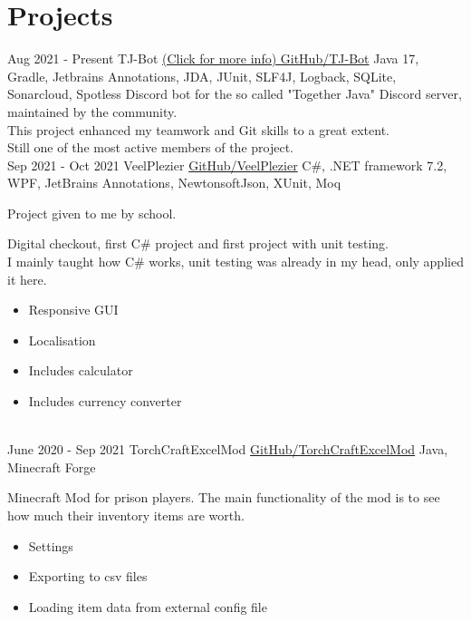 \documentclass[letterpaper]{twentysecondcv} %
\begin{document}
    \section{Projects}
    \begin{twenty} %
        \twentyitem
        {Aug 2021 -}
        {Present}
        {TJ-Bot}
        {\href{https://github.com/Together-Java/TJ-Bot/}{(Click for more info) GitHub/TJ-Bot}}
        {Java 17, Gradle, Jetbrains Annotations, JDA, JUnit, SLF4J, Logback, SQLite, Sonarcloud, Spotless}
        {
            Discord bot for the so called "Together Java" Discord server, maintained by the community.\\
        This project enhanced my teamwork and Git skills to a great extent.\\
        Still one of the most active members of the project.
        }\\

        \twentyitem
        {Sep 2021 -}
        {Oct 2021}
        {VeelPlezier}
        {\href{https://github.com/Tais993/VeelPlezier}{GitHub/VeelPlezier}}
        {C\#, .NET framework 7.2, WPF, JetBrains Annotations, NewtonsoftJson, XUnit, Moq}
        {
            Project given to me by school.

            Digital checkout, first C\# project and first project with unit testing.\\
        I mainly taught how C\# works, unit testing was already in my head, only applied it here.

            \begin{itemize}
                \item Responsive GUI
                \item Localisation
                \item Includes calculator
                \item Includes currency converter
            \end{itemize}
        }\\

        \twentyitem
        {June 2020 -}
        {Sep 2021}
        {TorchCraftExcelMod}
        {\href{https://github.com/Tais993/TorchCraftExcelMod}{GitHub/TorchCraftExcelMod}}
        {Java, Minecraft Forge}
        {
            Minecraft Mod for prison players.
            The main functionality of the mod is to see how much their inventory items are worth.
            \begin{itemize}
                \item Settings
                \item Exporting to csv files
                \item Loading item data from external config file
            \end{itemize}
        }\\
    \end{twenty}
\end{document}
